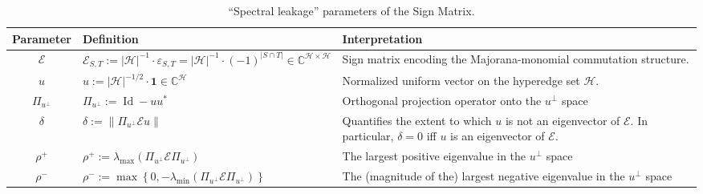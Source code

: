 \documentclass
[11pt,letterpaper]
{article}
\theoremstyle{definition}
\newcommand{\eps}{\varepsilon}
\newcommand{\cE}{{\mathcal E}}
\newcommand{\1}{\mathbf{1}}
\newcommand{\C}{\mathbb C}
\newcommand{\cH}{\mathcal H}
\newcommand{\Id}{\operatorname{Id}}
\begin{document}
\begin{table}[t]
\centering
\renewcommand{\arraystretch}{1.4}
\begin{tabular}{|c|p{}|p{}|}
\hline
\textbf{Parameter}
&
\textbf{Definition}
&
\textbf{Interpretation}
\\
\hline

$\cE$
&
$\displaystyle
\cE_{S,T}
:=
|\cH|^{-1}\cdot\eps_{S,T}
=
|\cH|^{-1}\cdot(-1)^{|S\cap T|}\in\C^{\cH\times\cH}
$
&
Sign matrix encoding the Majorana-monomial commutation
structure. 
\\
\hline

$u$
&
$\displaystyle
u
:=
|\cH|^{-1/2}\cdot\1\in\C^\cH
$
&
Normalized uniform vector on the hyperedge set $\cH$. 
\\
\hline

$\Pi_{u^\perp}$
&
$\displaystyle
\Pi_{u^\perp}
:=
\Id - uu^*
$
&
Orthogonal projection operator onto the $u^\perp$ space
\\
\hline








$\delta$
&
$\displaystyle
\delta
:=
\left\|
\Pi_{u^\perp}\cE u
\right\|
$
&
Quantifies the extent to which $u$ is not an eigenvector of $\cE$. In particular, $\delta = 0$ iff $u$ is an eigenvector of $\cE$.
\\
\hline

$\rho^{+}$
&
$\displaystyle
\rho^{+}
:=
\lambda_{\max}
\left(
\Pi_{u^\perp}\cE\Pi_{u^\perp}
\right)
$
&
The largest positive eigenvalue in the $u^\perp$ space
\\
\hline

$\rho^{-}$
&
$\displaystyle
\rho^{-}
:=
\max\left\{
0,
-\lambda_{\min}
\left(
\Pi_{u^\perp}\cE\Pi_{u^\perp}
\right)
\right\}
$
&
The (magnitude of the) largest negative eigenvalue in the $u^\perp$ space
\\
\hline
\end{tabular}

\caption{``Spectral leakage'' parameters of the Sign Matrix.}
\label{tab:sign-matrix-parameters}
\end{table}
\end{document}
